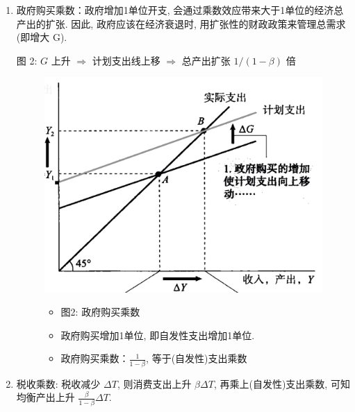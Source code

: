 \begin{enumerate}
\def\labelenumi{\arabic{enumi}.}
\item
  政府购买乘数：政府增加1单位开支, 会通过乘数效应带来大于1单位的经济总产出的扩张. 因此, 政府应该在经济衰退时, 用扩张性的财政政策来管理总需求(即增大 G). 
  
  图 2: $G$ 上升 $\Rightarrow$ 计划支出线上移 $\Rightarrow$ 总产出扩张 $1/ (1-\beta)$ 倍

\begin{figure}[H]
\centering
\begin{minipage}{.55\textwidth}
  \includegraphics[width=.9\linewidth]{../../fig/ch10-1.jpeg}

\end{minipage}%
\begin{minipage}{.4\textwidth}
  \begin{itemize}
  \item 
    图2:  政府购买乘数
  \item 
    政府购买增加1单位, 即自发性支出增加1单位. 
  \item
    政府购买乘数：$\frac{1}{1-\beta}$, 等于(自发性)支出乘数
  \end{itemize}
\end{minipage}
\end{figure}

\item
  税收乘数: 税收减少 $\Delta T$,  则消费支出上升 $\beta \Delta T$, 
  再乘上(自发性)支出乘数, 可知均衡产出上升 $\frac{\beta}{1- \beta} \Delta T $.
  

\end{enumerate}
